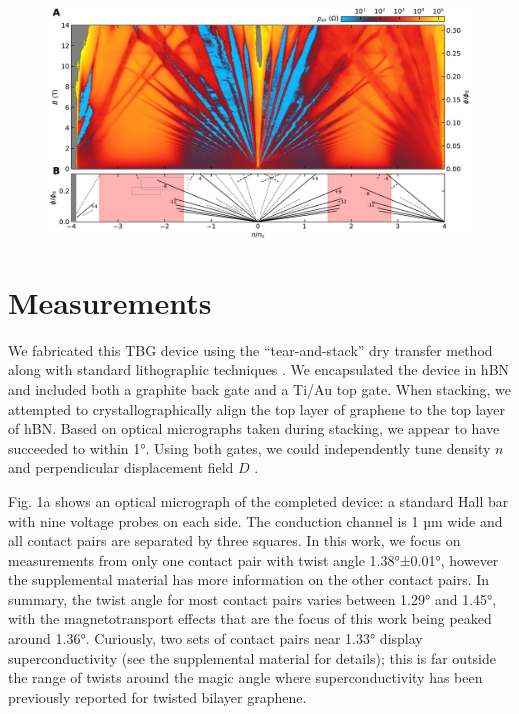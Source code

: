 \documentclass[12pt,twocolumn]{article}
\begin{document}
\begin{figure}[t!]
\includegraphics[width=\textwidth]{fig2.pdf}
\end{figure}

\section{Measurements}

\noindent We fabricated this TBG device using the “tear-and-stack” dry transfer method along with standard lithographic techniques \cite{caoSuperlatticeInducedInsulatingStates2016,kimVanWaalsHeterostructures2016}. We encapsulated the device in hBN and included both a graphite back gate and a Ti/Au top gate. When stacking, we attempted to crystallographically align the top layer of graphene to the top layer of hBN. Based on optical micrographs taken during stacking, we appear to have succeeded to within 1°. Using both gates, we could independently tune density $n$ and perpendicular displacement field $D$ \cite{oostingaGateinducedInsulatingState2008}.

Fig. 1a shows an optical micrograph of the completed device: a standard Hall bar with nine voltage probes on each side. The conduction channel is 1 µm wide and all contact pairs are separated by three squares. In this work, we focus on measurements from only one contact pair with twist angle 1.38°±0.01°, however the supplemental material has more information on the other contact pairs. In summary, the twist angle for most contact pairs varies between 1.29° and 1.45°, with the magnetotransport effects that are the focus of this work being peaked around 1.36°. Curiously, two sets of contact pairs near 1.33° display superconductivity (see the supplemental material for details); this is far outside the range of twists around the magic angle where superconductivity has been previously reported for twisted bilayer graphene.
\end{document}
